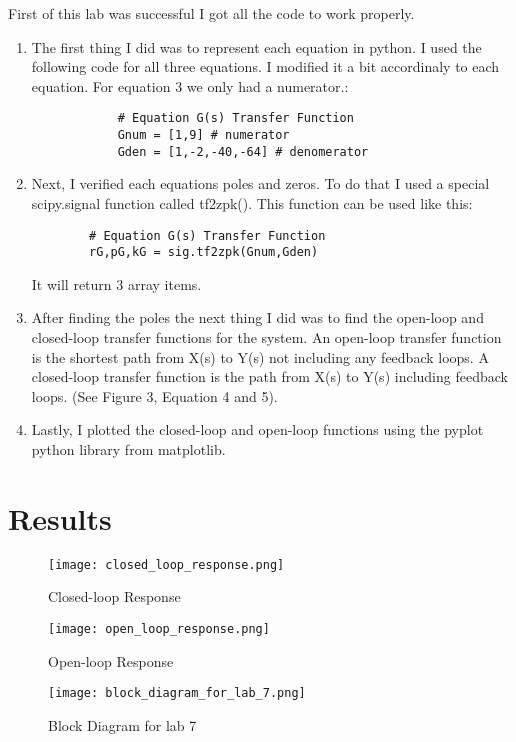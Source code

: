 \documentclass[12pt]{article}
\begin{document}
First of this lab was successful I got all the code to work properly.
\begin{enumerate}
    \item The first thing I did was to represent each equation in python. I used the following code for all three equations. I modified it a bit accordinaly to each equation. For equation 3 we only had a numerator.: 
        \begin{lstlisting}
            # Equation G(s) Transfer Function
            Gnum = [1,9] # numerator
            Gden = [1,-2,-40,-64] # denomerator
        \end{lstlisting}
    \item Next, I verified each equations poles and zeros. To do that I used a special scipy.signal function called tf2zpk(). This function can be used like this:
    \begin{lstlisting}
        # Equation G(s) Transfer Function
        rG,pG,kG = sig.tf2zpk(Gnum,Gden)
    \end{lstlisting} It will return 3 array items.
    \item After finding the poles the next thing I did was to find the open-loop and closed-loop transfer functions for the system. An open-loop transfer function is the shortest path from X(s) to Y(s) not including any feedback loops. A closed-loop transfer function is the path from X(s) to Y(s) including feedback loops. (See Figure 3, Equation 4 and 5).
    \item Lastly, I plotted the closed-loop and open-loop functions using the pyplot python library from matplotlib.
    
\end{enumerate}

\section{Results}

\begin{figure}[H]
\caption{Closed-loop Response}
\centering
\texttt{[image: closed\_loop\_response.png]}
\end{figure}

\begin{figure}[H]
\caption{Open-loop Response}
\centering
\texttt{[image: open\_loop\_response.png]}
\end{figure}

\begin{figure}[H]
\caption{Block Diagram for lab 7}
\centering
\texttt{[image: block\_diagram\_for\_lab\_7.png]}
\end{figure}
\end{document}
